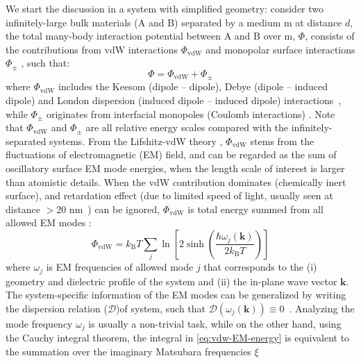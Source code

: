 We start the discussion in a system with simplified geometry: consider
two infinitely-large bulk materials (A and B) separated by a medium m
at distance \(d\), the total many-body interaction potential between A
and B over m, \(\Phi\), consists of the contributions from vdW
interactions \(\Phi_{\mathrm{vdW}}\) and mono\-polar surface
interactions \(\Phi_{\pm}\)
\cite{van_Oss_1987_monopolar,Van_Oss_1988}, such that:
\begin{equation}
\label{eq:vdw-phi-oss}
\Phi = \Phi_{\mathrm{vdW}} + \Phi_{\pm}
\end{equation}
where \(\Phi_{\mathrm{vdW}}\) includes the Keesom (dipole -- dipole),
Debye (dipole -- induced dipole) and London dispersion (induced dipole
-- induced dipole) interactions~\cite{Israelachvili_2011_book}, while
\(\Phi_{\pm}\) originates from interfacial monopoles (Coulomb
interactions) \cite{van_Oss_1987_monopolar}.
%
Note that $\Phi_{\mathrm{vdW}}$ and $\Phi_{\pm}$ are all relative
energy scales compared with the infinitely-separated systems.
%
From the Lifshitz-vdW theory \cite{Dzyaloshinskii_1961_lifshitz},
\(\Phi_{\mathrm{vdW}}\) stems from the fluctuations of electromagnetic
(EM) field, and can be regarded as the sum of oscillatory surface EM
mode energies, when the length scale of interest is larger than
atomistic details.
%
When the vdW contribution dominates (\ie chemically inert surface),
and retardation effect (due to limited speed of light, usually seen at
distance $>$20 nm~\cite{parsegian_van_2010_book}) can be ignored,
$\Phi_{\mathrm{vdW}}$ is total energy summed from all allowed EM modes
\cite{Li_2005_diele}:
\begin{equation}
\label{eq:vdw-EM-energy}
\Phi_{\mathrm{vdW}} = k_{\mathrm{B}} T \sum_{j} \ln \left[2 \sinh\left(\frac{\hbar \omega_{j}(\mathbf{k})}{2 k_{\mathrm{B}} T}\right)\right] 
\end{equation}
where \(\omega_{j}\) is EM frequencies of allowed mode $j$ that
corresponds to the (i) geometry and dielectric profile of the system
and (ii) the in-plane wave vector \(\mathbf{k}\).
%
The system-specific information of the EM modes can be generalized by
writing the dispersion relation ($\mathcal{D}$)of system, such that
\(\mathcal{D}(\omega_{j}(\mathbf{k})) \equiv
0\)~\cite{Guttinger_1966_dispersion,Mahanty_1976_dispersion_book}.
%
Analyzing the mode frequency \(\omega_{j}\) is usually a non-trivial
task, while on the other hand, using the Cauchy integral theorem, the
integral in \autoref{eq:vdw-EM-energy} is equivalent to the summation
over the imaginary Matsubara frequencies $\xi$
